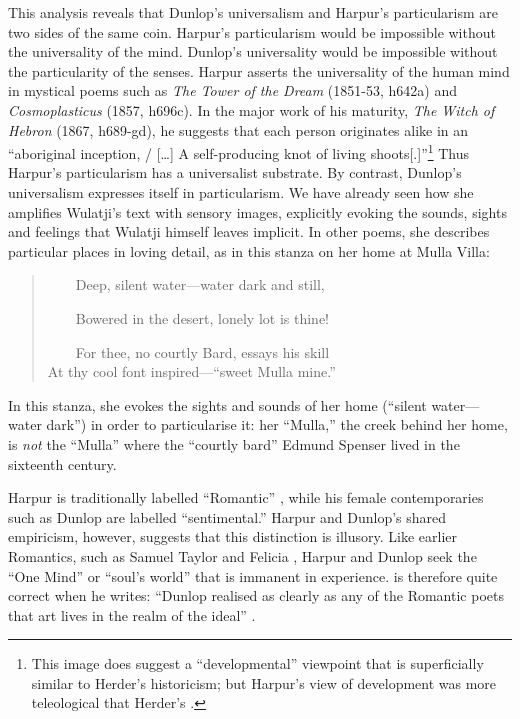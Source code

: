 \documentclass[
  Crown,
  times,
  sageh]{sagej}
\begin{document}
This analysis reveals that Dunlop's universalism and Harpur's
particularism are two sides of the same coin. Harpur's particularism
would be impossible without the universality of the mind. Dunlop's
universality would be impossible without the particularity of the
senses. Harpur asserts the universality of the human mind in mystical
poems such as \emph{The Tower of the Dream} (1851-53, h642a) and
\emph{Cosmoplasticus} (1857, h696c). In the major work of his maturity,
\emph{The Witch of Hebron} (1867, h689-gd), he suggests that each person
originates alike in an ``aboriginal inception, / {[}\ldots{]} A
self-producing knot of living shoots{[}.{]}''\footnote{This image does
  suggest a ``developmental'' viewpoint that is superficially similar to
  Herder's historicism; but Harpur's view of development was more
  teleological that Herder's \citep[6-10]{falk_endless_2019}.} Thus
Harpur's particularism has a universalist substrate. By contrast,
Dunlop's universalism expresses itself in particularism. We have already
seen how she amplifies Wulatji's text with sensory images, explicitly
evoking the sounds, sights and feelings that Wulatji himself leaves
implicit. In other poems, she describes particular places in loving
detail, as in this stanza on her home at Mulla Villa:

\begin{quote}
~~~~Deep, silent water---water dark and still,\\
\strut ~~~~Bowered in the desert, lonely lot is thine!\\
\strut ~~~~For thee, no courtly Bard, essays his skill\\
At thy cool font inspired---``sweet Mulla mine.''
\citep[198]{dunlop_selection_2021}
\end{quote}

In this stanza, she evokes the sights and sounds of her home (``silent
water---water dark'') in order to particularise it: her ``Mulla,'' the
creek behind her home, is \emph{not} the ``Mulla'' where the ``courtly
bard'' Edmund Spenser lived in the sixteenth century.

Harpur is traditionally labelled ``Romantic''
\citep[e.g.~by][]{kane_australian_1996, harpur_general_1987}, while his
female contemporaries such as Dunlop are labelled ``sentimental.''
Harpur and Dunlop's shared empiricism, however, suggests that this
distinction is illusory. Like earlier Romantics, such as Samuel Taylor
\citet{coleridge_eolian_1997} and Felicia \citet{hemans_beings_1839},
Harpur and Dunlop seek the ``One Mind'' or ``soul's world'' that is
immanent in experience. \citet[69]{wu_morning_2021} is therefore quite
correct when he writes: ``Dunlop realised as clearly as any of the
Romantic poets that art lives in the realm of the ideal''
\citetext{\citealp[see
also][109]{minter_settlement_2021}; \citealp[79]{hansord_imperial_2021}}.
\end{document}
